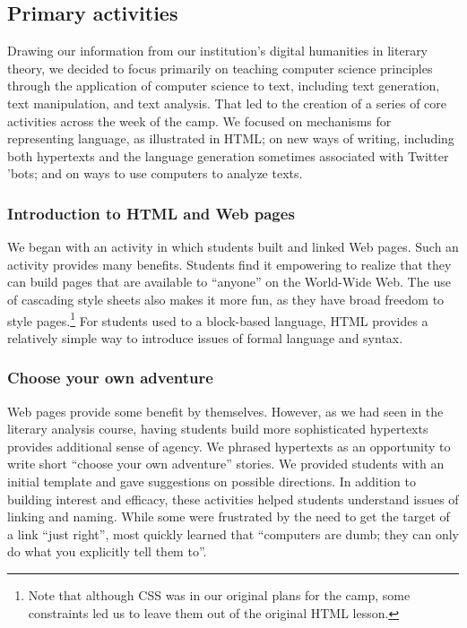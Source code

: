 \subsection{Primary activities}

Drawing our information from our institution's digital humanities in
literary theory, we decided to focus primarily on teaching computer
science principles through the application of computer science to text,
including text generation, text manipulation, and text analysis.  That
led to the creation of a series of core activities across the week of
the camp.  We focused on mechanisms for representing language,
as illustrated in HTML; on new ways of writing, including 
both hypertexts and the language generation sometimes associated
with Twitter 'bots; and on ways to use computers to analyze texts.

\subsubsection{Introduction to HTML and Web pages}

We began with an activity in which students built and linked Web
pages.  Such an activity provides many benefits.  Students find it
empowering to realize that they can build pages that are available
to ``anyone'' on the World-Wide Web.  The use of cascading style
sheets also makes it more fun, as they have broad freedom to style
pages.\footnote{Note that although CSS was in our original plans
for the camp, some constraints led us to leave them out of the
original HTML lesson.}  For students used to a block-based language,
HTML provides a relatively simple way to introduce issues of formal
language and syntax.

\subsubsection{Choose your own adventure}

Web pages provide some benefit by themselves.  However, as we had seen
in the literary analysis course, having students build more sophisticated
hypertexts provides additional sense of agency.  We phrased hypertexts
as an opportunity to write short ``choose your own adventure'' stories.
We provided students with an initial template and gave suggestions on
possible directions.  In addition to building interest and efficacy, these
activities helped students understand issues of linking and naming.
While some were frustrated by the need to get the target of a link
``just right'', most quickly learned that ``computers are dumb; they
can only do what you explicitly tell them to''.

